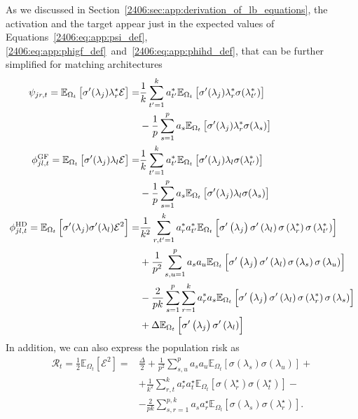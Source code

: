 As we discussed in Section~\ref{2406:sec:app:derivation_of_lb_equations}, the activation and the target appear just in the expected values of Equations~\eqref{2406:eq:app:psi_def},\eqref{2406:eq:app:phigf_def}~and~\eqref{2406:eq:app:phihd_def}, that can be further simplified for matching architectures
\[\begin{split}
    \psi_{jr,t} = \mathbb{E}_{\Omega_t}\left[ \sigma'(\lambda_j)\lambda^{\star}_{r} \mathcal{E} \right] =& \frac{1}{k}\sum_{t'=1}^k a^*_{t'} \mathbb{E}_{\Omega_t}\left[
\sigma^\prime(\lambda_j)\lambda^*_r \sigma(\lambda^*_{t'})
    \right] \\
    &- \frac{1}{p}\sum_{s=1}^p a_s \mathbb{E}_{\Omega_t}\left[
\sigma^\prime(\lambda_j)\lambda^*_r \sigma(\lambda_s)
    \right] \\
\phi^{\rm{GF}}_{jl,t} = \mathbb{E}_{\Omega_t}\left[ \sigma'(\lambda_j)\lambda_{l} \mathcal{E} \right] =&  \frac{1}{k}\sum_{t'=1}^k a^*_{t'} \mathbb{E}_{\Omega_t}\left[
\sigma^\prime(\lambda_j)\lambda_l \sigma(\lambda^*_{t'})
    \right] \\
    &- \frac{1}{p}\sum_{s=1}^p a_s \mathbb{E}_{\Omega_t}\left[
\sigma^\prime(\lambda_j)\lambda_l \sigma(\lambda_s)
    \right] \\ 
\phi^{\rm{HD}}_{jl,t} = \mathbb{E}_{\Omega_t}\left[ \sigma'(\lambda_j)\sigma'(\lambda_l)\mathcal{E}^2  \right] =& \frac{1}{k^2} \sum_{r, t'=1}^{k} a^*_r a^*_{t'} \mathbb{E}_{\Omega_t}\left[\sigma^{\prime}\left(\lambda_j\right) \sigma^{\prime}\left(\lambda_l\right) \sigma\left(\lambda_r^*\right) \sigma\left(\lambda_{t'}^*\right)\right] \\
& +\frac{1}{p^2} \sum_{s,u=1}^p a_s a_{u}\mathbb{E}_{\Omega_t}\left[\sigma^{\prime}\left(\lambda_j\right) \sigma^{\prime}\left(\lambda_l\right) \sigma\left(\lambda_s\right) \sigma\left(\lambda_{u}\right)\right] \\
& -\frac{2}{pk} \sum_{s=1}^p \sum_{r=1}^k a^*_r a_s \mathbb{E}_{\Omega_t}\left[\sigma^{\prime}\left(\lambda_j\right) \sigma^{\prime}\left(\lambda_l\right) \sigma\left(\lambda_r^*\right) \sigma\left(\lambda_{s}\right)\right] \\
& +\Delta  \mathbb{E}_{\Omega_t}\left[\sigma^{\prime}\left(\lambda_j\right) \sigma^{\prime}\left(\lambda_l\right)\right]
\end{split}\]
In addition, we can also express the population risk as
\begin{equation*}\begin{split}
\mathcal{R}_t= \frac 12 \mathbb E_{\Omega_t} \left[\mathcal{E}^2\right] =& \frac\Delta2 + \frac{1}{p^2}\sum_{s,u}^p a_s a_u \mathbb E_{\Omega_t} \left[\sigma(\lambda_s)\sigma(\lambda_u)\right] +\\
&+
\frac{1}{k^2}\sum_{r,t}^k a^\star_r a^\star_t \mathbb E_{\Omega_t} \left[\sigma(\lambda^\star_r) \sigma(\lambda^\star_t)\right]
-\\ &-\frac{2}{pk} \sum_{s,r=1}^{p,k} a_s a^\star_r\mathbb E_{\Omega_t} \left[\sigma(\lambda_s)\sigma(\lambda^\star_r)\right].
\end{split}\end{equation*}
